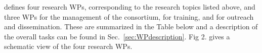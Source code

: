 
\acronym defines four research WPs, corresponding to the research topics listed above, and three WPs for the management of the consortium, for training, and for outreach and dissemination. These are summarized in the Table below and a description of the overall tasks can be found in Sec.~\ref{sec:WPdescription}. Fig 2. gives a schematic view of the four research WPs. 


